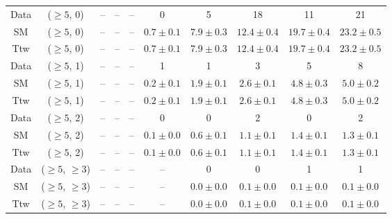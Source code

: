 \begin{table}[h!]
{\begin{tabular}{cccccccccc}
	Data & ($\ge5$, 0) & -- & -- & -- & 0 & 5 & 18 & 11 & 21 \\[0.5ex] 
	SM & ($\ge5$, 0) & -- & -- & -- & $0.7\pm 0.1$ & $7.9\pm 0.3$ & $12.4\pm 0.4$ & $19.7\pm 0.4$ & $23.2\pm 0.5$ \\[0.5ex] 
	Ttw & ($\ge5$, 0) & -- & -- & -- & $0.7\pm 0.1$ & $7.9\pm 0.3$ & $12.4\pm 0.4$ & $19.7\pm 0.4$ & $23.2\pm 0.5$ \\[0.5ex] 
	Data & ($\ge5$, 1) & -- & -- & -- & 1 & 1 & 3 & 5 & 8 \\[0.5ex] 
	SM & ($\ge5$, 1) & -- & -- & -- & $0.2\pm 0.1$ & $1.9\pm 0.1$ & $2.6\pm 0.1$ & $4.8\pm 0.3$ & $5.0\pm 0.2$ \\[0.5ex] 
	Ttw & ($\ge5$, 1) & -- & -- & -- & $0.2\pm 0.1$ & $1.9\pm 0.1$ & $2.6\pm 0.1$ & $4.8\pm 0.3$ & $5.0\pm 0.2$ \\[0.5ex] 
	Data & ($\ge5$, 2) & -- & -- & -- & 0 & 0 & 2 & 0 & 2 \\[0.5ex] 
	SM & ($\ge5$, 2) & -- & -- & -- & $0.1\pm 0.0$ & $0.6\pm 0.1$ & $1.1\pm 0.1$ & $1.4\pm 0.1$ & $1.3\pm 0.1$ \\[0.5ex] 
	Ttw & ($\ge5$, 2) & -- & -- & -- & $0.1\pm 0.0$ & $0.6\pm 0.1$ & $1.1\pm 0.1$ & $1.4\pm 0.1$ & $1.3\pm 0.1$ \\[0.5ex] 
	Data & ($\ge5$, $\ge3$) & -- & -- & -- & -- & 0 & 0 & 1 & 1 \\[0.5ex] 
	SM & ($\ge5$, $\ge3$) & -- & -- & -- & -- & $0.0\pm 0.0$ & $0.1\pm 0.0$ & $0.1\pm 0.0$ & $0.1\pm 0.0$ \\[0.5ex] 
	Ttw & ($\ge5$, $\ge3$) & -- & -- & -- & -- & $0.0\pm 0.0$ & $0.1\pm 0.0$ & $0.1\pm 0.0$ & $0.1\pm 0.0$ \\[0.5ex] 
	\hline
	\hline
\end{tabular}}
\end{table}

